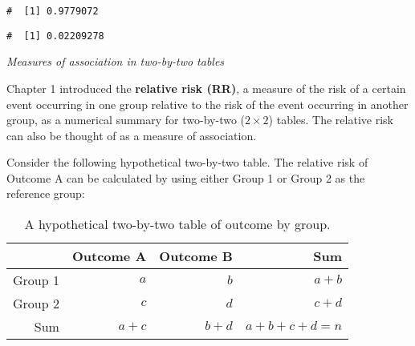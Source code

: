 \documentclass[letterpaper,12pt,twoside,]{pinp}
\begin{document}
\begin{Shaded}
\begin{Highlighting}[]
\NormalTok{(}\NormalTok{, }\NormalTok{, }\NormalTok{, }\NormalTok{)}
\end{Highlighting}
\end{Shaded}

\begin{ShadedResult}
\begin{verbatim}
#  [1] 0.9779072
\end{verbatim}
\end{ShadedResult}

\begin{Shaded}
\begin{Highlighting}[]
\NormalTok{(}\NormalTok{, }\NormalTok{, }\NormalTok{, }\NormalTok{, } \NormalTok{)}
\end{Highlighting}
\end{Shaded}

\begin{ShadedResult}
\begin{verbatim}
#  [1] 0.02209278
\end{verbatim}
\end{ShadedResult}

\vspace{0.5cm}

\emph{Measures of association in two-by-two tables}

Chapter 1 introduced the \textbf{relative risk (RR)}, a measure of the
risk of a certain event occurring in one group relative to the risk of
the event occurring in another group, as a numerical summary for
two-by-two (\(2 \times 2\)) tables. The relative risk can also be
thought of as a measure of association.

Consider the following hypothetical two-by-two table. The relative risk
of Outcome A can be calculated by using either Group 1 or Group 2 as the
reference group:

\begin{table}[h!]
    \centering
    \begin{tabular}{r|rrr}
        \hline
        & Outcome A & Outcome B & Sum\\ 
        \hline
        Group 1 & $a$ & $b$ & $a + b$ \\ 
        Group 2 & $c$ & $d$ & $c + d$ \\
        Sum & $a + c$ & $b + d$ & $a + b + c + d = n$ \\
        \hline
    \end{tabular}   
    \caption{A hypothetical two-by-two table of outcome by group.}
\end{table}
\end{document}
